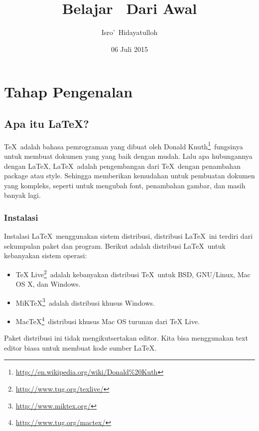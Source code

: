 \documentclass[12pt,oneside]{book}
\title{Belajar \LaTeXe\ Dari Awal}
\author{Isro\rq\ Hidayatulloh}
\date{06 Juli 2015}
\begin{document}
\renewcommand{\contentsname}{Daftar Isi}
\renewcommand{\partname}{Bagian}
\renewcommand{\chaptername}{BAB}
\renewcommand{\figurename}{Gambar}
\renewcommand{\tablename}{Tabel}
\renewcommand{\bibname}{Daftar Pustaka}
\renewcommand{\listtablename}{Daftar Tabel}
\renewcommand{\listfigurename}{Daftar Gambar}
\setcounter{secnumdepth}{2}
\maketitle
\tableofcontents

\part{Tahap Pengenalan}%

\chapter{Apa itu \LaTeX?}
\TeX\ adalah bahasa pemrograman yang dibuat oleh Donald Knuth\footnote{\url{http://en.wikipedia.org/wiki/Donald\%20Kuth}}\ fungsinya untuk membuat dokumen yang yang baik dengan mudah. Lalu apa hubungannya dengan \LaTeX , \LaTeX\ adalah pengembangan dari \TeX\ dengan penambahan package atau style. Sehingga memberikan kemudahan untuk pembuatan dokumen yang kompleks, seperti untuk mengubah font, penambahan gambar, dan masih banyak lagi.

\section{Instalasi}
Instalasi \LaTeX\ menggunakan sistem distribusi, distribusi \LaTeX\ ini terdiri dari sekumpulan paket dan program. Berikut adalah distribusi \LaTeX\ untuk kebanyakan sistem operasi:
\begin{itemize}
	\item TeX Live\footnote{\url{http://www.tug.org/texlive/}}\ adalah kebanyakan distribusi \TeX\ untuk BSD, GNU/Linux, Mac OS X, dan Windows.
	\item MiKTeX\footnote{\url{http://www.miktex.org/}}\ adalah distribusi khusus Windows.
	\item MacTeX\footnote{\url{http://www.tug.org/mactex/}}\ distribusi khusus Mac OS turunan dari TeX Live.
\end{itemize}
Paket distribusi ini tidak mengikutsertakan editor. Kita bisa menggunakan text editor biasa untuk membuat kode sumber \LaTeX .
\end{document}
